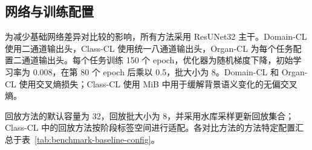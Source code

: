 \subsection{网络与训练配置}
\label{sec:benchmark-protocol}

为减少基础网络差异对比较的影响，所有方法采用 ResUNet32 主干。Domain-CL 使用二通道输出头，Class-CL 使用统一八通道输出头，Organ-CL 为每个任务配置二通道输出头。每个任务训练 150 个 epoch，优化器为随机梯度下降，初始学习率为 0.008，在第 80 个 epoch 后乘以 0.5，批大小为 8。Domain-CL 和 Organ-CL 使用交叉熵损失；Class-CL 使用 MiB 中用于缓解背景语义变化的无偏交叉熵。

回放方法的默认容量为 32，回放批大小为 8，并采用水库采样更新回放集合；Class-CL 中的回放方法按阶段标签空间进行适配。各对比方法的方法特定配置汇总于表~\ref{tab:benchmark-baseline-config}。

